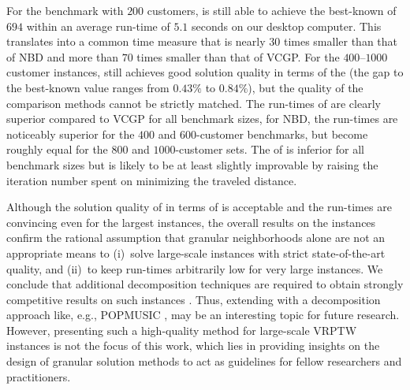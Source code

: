 \documentclass[11pt,a4paper,fleqn]{article}
\begin{document}
For the benchmark with $200$ customers, \tsnew is still able to achieve the best-known \cnvs of $694$ within an average run-time of $5.1$ seconds on our desktop computer. This translates into a common time measure that is nearly $30$ times smaller than that of NBD and more than $70$ times smaller than that of VCGP. For the $400$--$1000$ customer instances, \tsnew still achieves good solution quality in terms of the \cnvs (the gap to the best-known value ranges from $0.43\%$ to $0.84\%$), but the quality of the comparison methods cannot be strictly matched. The run-times of \tsnew are clearly superior compared to VCGP for all benchmark sizes, for NBD, the run-times are noticeably superior for the $400$ and $600$-customer benchmarks, but become roughly equal for the $800$ and $1000$-customer sets. The \ctds of \tsnew is inferior for all benchmark sizes but is likely to be at least slightly improvable by raising the iteration number spent on minimizing the traveled distance.

Although the solution quality of \tsnew in terms of \cnvs is acceptable and the run-times are convincing even for the largest instances, the overall results on the \citeauthor{gehring:99} instances confirm the rational assumption that granular neighborhoods alone are not an appropriate means to (i)~solve large-scale instances with strict state-of-the-art quality, and (ii)~to keep run-times arbitrarily low for very large instances. We conclude that additional decomposition techniques are required to obtain strongly competitive results on such instances \citep[see, e.g.][]{vidal:13}. Thus, extending \tsnew with a decomposition approach like, e.g., POPMUSIC \citep{popmusic}, may be an interesting topic for future research. However, presenting such a high-quality method for large-scale VRPTW instances is not the focus of this work, which lies in providing insights on the design of granular solution methods to act as guidelines for fellow researchers and practitioners.  

\paragraph*{}
\end{document}

